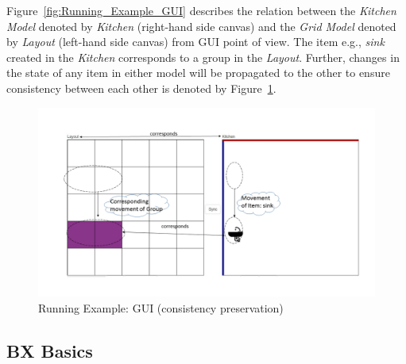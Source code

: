 Figure~\ref{fig:Running_Example_GUI} describes the relation between the \textit{Kitchen Model} denoted by \textit{Kitchen} (right-hand side canvas) and the \textit{Grid Model} denoted by \textit{Layout} (left-hand side canvas) from GUI point of view. The item e.g., \textit{sink} created in the \textit{Kitchen} corresponds to a group in the \textit{Layout}. Further, changes in the state of any item in either model will be propagated to the other to ensure consistency between each other is denoted by Figure~\ref{fig:Running_Example_GUI_consistency}.

\begin{figure}
	\includegraphics[width=1\textwidth]{figures/KitchenToGrid_consistency}
	\caption{Running Example: GUI (consistency preservation)}
	\label{fig:Running_Example_GUI_consistency}
\end{figure}

\subsection{BX Basics}\label{subsec:definitions}
